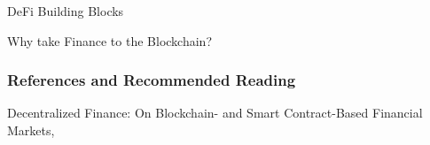 \documentclass[]{beamer}
\begin{document}


\begin{frame}{DeFi Building Blocks}
	\scalebox{0.7}{
	\begin{tikzpicture}
	
	\end{tikzpicture}
	}
\end{frame}


\begin{frame}{Why take Finance to the Blockchain?}
	
	\scalebox{0.85}{
	\begin{tikzpicture}
		
		
	\end{tikzpicture}
	}
\end{frame}



\begin{frame}%
\frametitle{References and Recommended Reading}
	
	
	Decentralized Finance: On Blockchain- and Smart Contract-Based Financial Markets, \cite{schaer_2021}
\end{frame}
\end{document}
